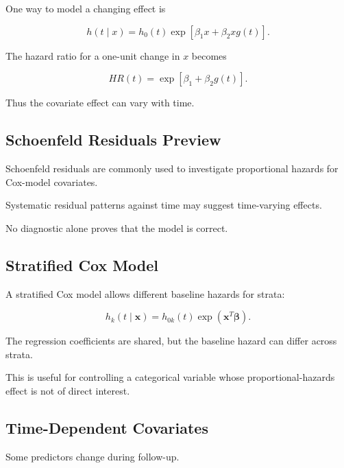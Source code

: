 One way to model a changing effect is

\[
\boxed{
h(t\mid x)
=
h_0(t)
\exp
[
\beta_1x
+
\beta_2xg(t)
].
}
\]

The hazard ratio for a one-unit change in \(x\) becomes

\[
\boxed{
HR(t)
=
\exp
[
\beta_1+\beta_2g(t)
].
}
\]

Thus the covariate effect can vary with time.

\subsection{Schoenfeld Residuals Preview}
\label{subsec:schoenfeld-residuals-preview}

Schoenfeld residuals are commonly used to investigate proportional
hazards for Cox-model covariates.

Systematic residual patterns against time may suggest time-varying
effects.

No diagnostic alone proves that the model is correct.

\subsection{Stratified Cox Model}
\label{subsec:stratified-cox}

A stratified Cox model allows different baseline hazards for strata:

\[
\boxed{
h_k
(
t\mid\mathbf{x}
)
=
h_{0k}(t)
\exp
(
\mathbf{x}^T
\boldsymbol{\beta}
).
}
\]

The regression coefficients are shared, but the baseline hazard can
differ across strata.

This is useful for controlling a categorical variable whose
proportional-hazards effect is not of direct interest.

\subsection{Time-Dependent Covariates}
\label{subsec:time-dependent-covariates}

Some predictors change during follow-up.

